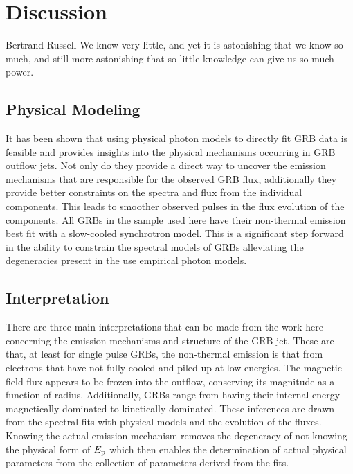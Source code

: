 \chapter{Discussion} 

\begin{chapterquote}{Bertrand Russell}
  We know very little, and yet it is astonishing that we know so much,
  and still more astonishing that so little knowledge can give us so
  much power.
\end{chapterquote}

\section{Physical Modeling}
It has been shown that using physical photon models to directly fit
GRB data is feasible and provides insights into the physical
mechanisms occurring in GRB outflow jets. Not only do they provide a
direct way to uncover the emission mechanisms that are responsible for
the observed GRB flux, additionally they provide better constraints on
the spectra and flux from the individual components. This leads to
smoother observed pulses in the flux evolution of the components. All
GRBs in the sample used here have their non-thermal emission best fit
with a slow-cooled synchrotron model. This is a significant step
forward in the ability to constrain the spectral models of GRBs
alleviating the degeneracies present in the use empirical photon
models.

\section{Interpretation}
There are three main interpretations that can be made from the work
here concerning the emission mechanisms and structure of the GRB
jet. These are that, at least for single pulse GRBs, the non-thermal
emission is that from electrons that have not fully cooled and piled
up at low energies. The magnetic field flux appears to be frozen into
the outflow, conserving its magnitude as a function of
radius. Additionally, GRBs range from having their internal energy
magnetically dominated to kinetically dominated. These inferences are
drawn from the spectral fits with physical models and the evolution of
the fluxes. Knowing the actual emission mechanism removes the
degeneracy of not knowing the physical form of $E_{\rm p}$ which then
enables the determination of actual physical parameters from the
collection of parameters derived from the fits.

